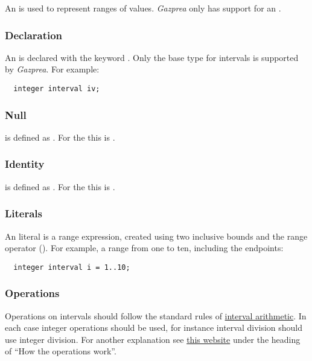 \documentclass[types.tex]{subfiles}
\begin{document}
An  is used to represent ranges of values. \textit{Gazprea} only has support for an
 .

\subsubsection{Declaration}
\label{sssec:inteval_decl}
An  is declared with the keyword . Only the  base type
for intervals is supported by \textit{Gazprea}. For example:
\begin{lstlisting}
  integer interval iv;
\end{lstlisting}

\subsubsection{Null}
\label{sssec:interval_null}
 is defined as . For the   this is
.

\subsubsection{Identity}
\label{sssec:interval_ident}
 is defined as . For the   this
is .

\subsubsection{Literals}
\label{sssec:interval_lit}
An  literal is a range expression, created using two inclusive bounds and the range
operator (). For example, a range from one to ten, including the endpoints:
\begin{lstlisting}
  integer interval i = 1..10;
\end{lstlisting}

\subsubsection{Operations}
\label{sssec:interval_ops}
Operations on intervals should follow the standard rules of
\href{http://en.wikipedia.org/wiki/Interval_arithmetic}{interval arithmetic}. In each case integer
operations should be used, for instance interval division should use integer division. For another
explanation see \href{http://www.csgnetwork.com/directintervalcalc.html}{this website} under the
heading of ``How the operations work''.
\end{document}
